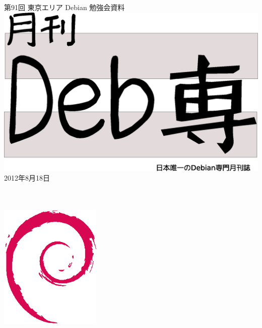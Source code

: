 \documentclass[mingoth,a4paper]{jsarticle}
\newcommand{\debmtgyear}{2012}
\newcommand{\debmtgmonth}{8}
\newcommand{\debmtgdate}{18}
\newcommand{\debmtgnumber}{91}
\begin{document}
\begin{titlepage}
\thispagestyle{empty}

\vspace*{-2cm}
第\debmtgnumber{}回 東京エリア Debian 勉強会資料\\
\hspace*{-2cm}
\includegraphics[width=210mm]{image201003/debsen.eps}\\
\hfill{}\debmtgyear{}年\debmtgmonth{}月\debmtgdate{}日

\\
\\

\vspace*{-2cm}
\hfill{}\includegraphics[height=6cm]{image200502/openlogo-nd.eps}
\end{titlepage}

\end{document}
